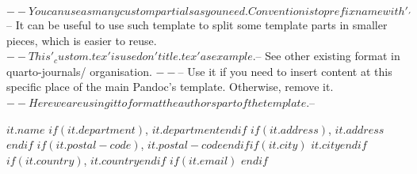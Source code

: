 $-- You can use as many custom partials as you need. Convention is to prefix name with '_'
$-- It can be useful to use such template to split some template parts in smaller pieces, which is easier to reuse. 
$-- This '_custom.tex' is used on 'title.tex' as example.
$-- See other existing format in quarto-journals/ organisation.
$-- %
$-- Use it if you need to insert content at this specific place of the main Pandoc's template. Otherwise, remove it.
$-- Here we are using it to format the authors part of the template.
$-- %

$it.name$%
$if(it.department)$, $it.department$$endif$%
$if(it.address)$, $it.address$$endif$%
$if(it.postal-code)$, $it.postal-code$$endif$$if(it.city)$ $it.city$$endif$%
$if(it.country)$, $it.country$$endif$%
$if(it.email)$ $endif$